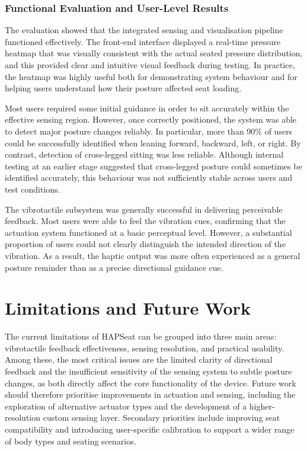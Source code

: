 \documentclass[11pt, a4paper]{article}
\begin{document}
\subsubsection{Functional Evaluation and User-Level Results}

The evaluation showed that the integrated sensing and visualisation pipeline functioned effectively. The front-end interface displayed a real-time pressure heatmap that was visually consistent with the actual seated pressure distribution, and this provided clear and intuitive visual feedback during testing. In practice, the heatmap was highly useful both for demonstrating system behaviour and for helping users understand how their posture affected seat loading.

Most users required some initial guidance in order to sit accurately within the effective sensing region. However, once correctly positioned, the system was able to detect major posture changes reliably. In particular, more than 90\% of users could be successfully identified when leaning forward, backward, left, or right. By contrast, detection of cross-legged sitting was less reliable. Although internal testing at an earlier stage suggested that cross-legged posture could sometimes be identified accurately, this behaviour was not sufficiently stable across users and test conditions.

The vibrotactile subsystem was generally successful in delivering perceivable feedback. Most users were able to feel the vibration cues, confirming that the actuation system functioned at a basic perceptual level. However, a substantial proportion of users could not clearly distinguish the intended direction of the vibration. As a result, the haptic output was more often experienced as a general posture reminder than as a precise directional guidance cue.


\section{Limitations and Future Work}

The current limitations of HAPSeat can be grouped into three main areas: vibrotactile feedback effectiveness, sensing resolution, and practical usability. Among these, the most critical issues are the limited clarity of directional feedback and the insufficient sensitivity of the sensing system to subtle posture changes, as both directly affect the core functionality of the device. Future work should therefore prioritise improvements in actuation and sensing, including the exploration of alternative actuator types and the development of a higher-resolution custom sensing layer. Secondary priorities include improving seat compatibility and introducing user-specific calibration to support a wider range of body types and seating scenarios.
\end{document}
